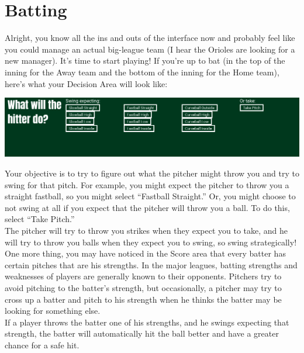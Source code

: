 \documentclass[12pt,a4paper]{report}
\begin{document}
\section{Batting}
Alright, you know all the ins and outs of the interface now and probably feel like you could manage an actual big-league team (I hear the Orioles are looking for a new manager). It's time to start playing! If you're up to bat (in the top of the inning for the Away team and the bottom of the inning for the Home team), here's what your Decision Area will look like:
\begin{center}
	\includegraphics[width=1\linewidth]{umInclude/hitter}
\end{center}
Your objective is to try to figure out what the pitcher might throw you and try to swing for that pitch. For example, you might expect the pitcher to throw you a straight fastball, so you might select ``Fastball Straight.'' Or, you might choose to not swing at all if you expect that the pitcher will throw you a ball. To do this, select ``Take Pitch.''\\
The pitcher will try to throw you strikes when they expect you to take, and he will try to throw you balls when they expect you to swing, so swing strategically!\\
One more thing, you may have noticed in the Score area that every batter has certain pitches that are his strengths. In the major leagues, batting strengths and weaknesses of players are generally known to their opponents. Pitchers try to avoid pitching to the batter's strength, but occasionally, a pitcher may try to cross up a batter and pitch to his strength when he thinks the batter may be looking for something else.\\
If a player throws the batter one of his strengths, and he swings expecting that strength, the batter will automatically hit the ball better and have a greater chance for a safe hit.
\end{document}
